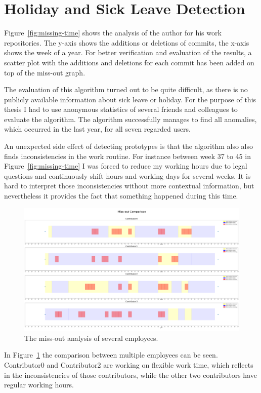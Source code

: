 \section{Holiday and Sick Leave Detection}

Figure~\ref{fig:missing-time} shows the analysis of the author for his work repositories.
The y-axis shows the additions or deletions of commits, the x-axis shows the week of a year.
For better verification and evaluation of the results, a scatter plot with the additions and deletions for each commit has been added on top of the miss-out graph.

The evaluation of this algorithm turned out to be quite difficult, as there is no publicly available information about sick leave or holiday.
For the purpose of this thesis I had to use anonymous statistics of several friends and colleagues to evaluate the algorithm.
The algorithm successfully manages to find all anomalies, which occurred in the last year, for all seven regarded users.

An unexpected side effect of detecting prototypes is that the algorithm also also finds inconsistencies in the work routine.
For instance between week 37 to 45 in Figure~\ref{fig:missing-time} I was forced to reduce my working hours due to legal questions and continuously shift hours and working days for several weeks.
It is hard to interpret those inconsistencies without more contextual information, but nevertheless it provides the fact that something happened during this time.

\begin{figure}[H]
    \includegraphics[scale=0.20]{./graphs/analysis/work-time-analysis-comparison}
    \centering
    \caption{The miss-out analysis of several employees.}\label{fig:miss-out-comparison}
\end{figure}

In Figure~\ref{fig:miss-out-comparison} the comparison between multiple employees can be seen.
Contributor0 and Contributor2 are working on flexible work time, which reflects in the inconsistencies of those contributors, while the other two contributors have regular working hours.
